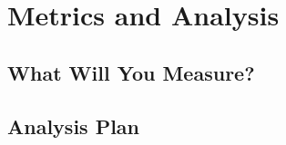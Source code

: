 \section{Metrics and Analysis}


\subsection{What Will You Measure?}




\subsection{Analysis Plan}



